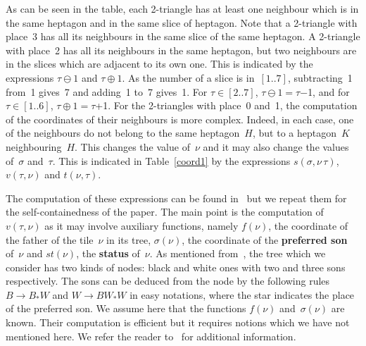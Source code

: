\documentclass{article}
\begin{document}
   As can be seen in the table, each 2-triangle has at least one neighbour which
is in the same heptagon and in the same slice of heptagon. Note that a 2-triangle
with place~3 has all its neighbours in the same slice of the same heptagon.
A 2-triangle with place~2 has all its neighbours in the same heptagon, but two
neighbours are in the slices which are adjacent to its own one. This is
indicated by the expressions $\tau\ominus1$ and $\tau\oplus1$. As
the number of a slice is in~$[1..7]$, subtracting~1 from~1 gives~7 
and adding~1 to~7 gives~1. For $\tau\in[2..7]$, \hbox{$\tau\ominus1=\tau$$-$1},
and for $\tau\in[1..6]$, \hbox{$\tau\oplus1=\tau$+1}. 
For the 2-triangles with place~0 and~1, the computation of the coordinates of
their neighbours is more complex. Indeed, in each case, one of the neighbours
do not belong to the same heptagon~$H$, but to a heptagon~$K$ neighbouring~$H$.
This changes the value of~$\nu$ and it may also change the values of~$\sigma$
and~$\tau$. This is indicated in Table~\ref{coord1} by the expressions 
$s(\sigma,\nu\,\tau)$, $v(\tau,\nu)$ and $t(\nu,\tau)$.

The computation of these expressions can be found in~\cite{mmbook1,mmbook2}
but we repeat them for the self-containedness of the paper.
The main point is the computation of~$v(\tau,\nu)$ as it may involve
auxiliary functions, namely $f(\nu)$, the coordinate of the father of the
tile~$\nu$ in its tree, $\sigma(\nu)$, the coordinate of the {\bf preferred son} 
of~$\nu$ and $st(\nu)$, the {\bf status} of~$\nu$. As mentioned 
from~\cite{mmkmTCS,mmJUCSii}, the tree which we consider has two kinds of nodes:
black and white ones with two and three sons respectively. The sons can be
deduced from the node by the following rules \hbox{$B\rightarrow B_*W$}
and \hbox{$W\rightarrow BW_*W$} in easy notations, where the star indicates the
place of the preferred son. We assume here that the functions $f(\nu)$ 
and~$\sigma(\nu)$ are known. Their computation is efficient but it requires
notions which we have not mentioned here. We refer the reader 
to~\cite{mmJUCSii,mmbook1,mmbook2} for additional information. 
\end{document}
